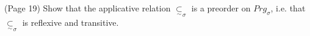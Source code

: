 (Page 19) Show that the applicative relation $ \underset{\sim}{\subset}_\sigma $ is a preorder on $Prg_\sigma$, i.e. that $ \underset{\sim}{\subset}_\sigma $ is reflexive and transitive.